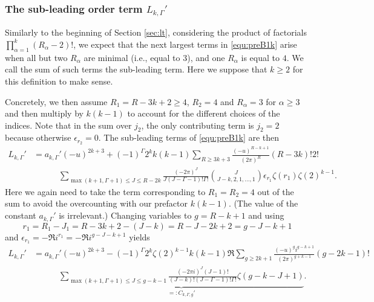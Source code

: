 \documentclass[12pt]{amsart}
\theoremstyle{definition}
\numberwithin{equation}{section}
\theoremstyle{definition} %
\theoremstyle{remark}
\begin{document}
\subsubsection{The sub-leading order term $L_{k,\Gamma}'$} \label{slt}
Similarly to the beginning of Section \ref{sec:lt}, considering the product of factorials $\prod_{\alpha=1}^k(R_\alpha - 2)!$, we expect that the next largest terms in \eqref{equ:preB1k} arise when
all but two $R_\alpha$ are minimal (i.e., equal to 3), and one $R_\alpha$ is equal to $4$. We call the sum of such terms the 
sub-leading term. Here we suppose that $k\geq 2$ for this definition to make sense.

Concretely, we then assume $R_1=R-3k+2\geq 4$, $R_2=4$ and $R_\alpha=3$ for $\alpha\geq 3$ and then multiply by $k(k-1)$ to account for the different choices of the indices.
Note that in the sum over $j_2$, the only contributing term is $j_2=2$ because otherwise $\epsilon_{r_2}=0$.
The sub-leading terms of \eqref{equ:preB1k} are then
\begin{align*}
    L_{k,\Gamma}' &= a_{k,\Gamma}'(-u)^{2k+3}+
    (-1)^\Gamma 2^k k(k-1)
    \sum_{R\geq 3k+3}
    \frac{(-u)^{R-k+1}}{(2\pi)^{R}}(R-3k)! 2!
    \\&\quad\quad\quad
    \sum_{\max(k+1,\Gamma+1)\leq J\leq R-2k} 
    \frac{(-2\pi)^J}{J (J-\Gamma-1)! \Gamma!}
    \binom{J}{J-k,2,1,\dots,1} 
    \epsilon_{r_1}\zeta(r_1)\zeta(2)^{k-1}.
\end{align*} 
Here we again need to take the term corresponding to $R_1=R_2=4$ out of the sum to avoid the overcounting with our prefactor $k(k-1)$. (The value of the constant $a_{k,\Gamma}'$ is irrelevant.)
Changing variables to $g=R-k+1$ and using 
$$r_1=R_1-J_1=R-3k+2-(J-k)=R-J-2k+2=g-J-k+1$$
and $\epsilon_{r_1}=-\Re i^{r_1}=-\Re i^{g-J-k+1}$ yields 
\begin{align*}
    L_{k,\Gamma}' &= a_{k,\Gamma}'(-u)^{2k+3}
    -(-1)^\Gamma 2^k\zeta(2)^{k-1} k(k-1)
    \Re 
    \sum_{g\geq 2k+1}
    \frac{(-u)^{g}i^{g-k+1}}{(2\pi)^{g+k-1}}(g-2k-1)!
    \\&\quad\quad\quad
    \underbrace{\sum_{\max(k+1,\Gamma+1)\leq J\leq g-k-1} 
    \frac{(-2\pi i)^J (J-1)!}{(J-k)! (J-\Gamma-1)! \Gamma!}
    \zeta(g-k-J+1)}_{=:C_{k,\Gamma,g}'}.
\end{align*} 
\end{document}
